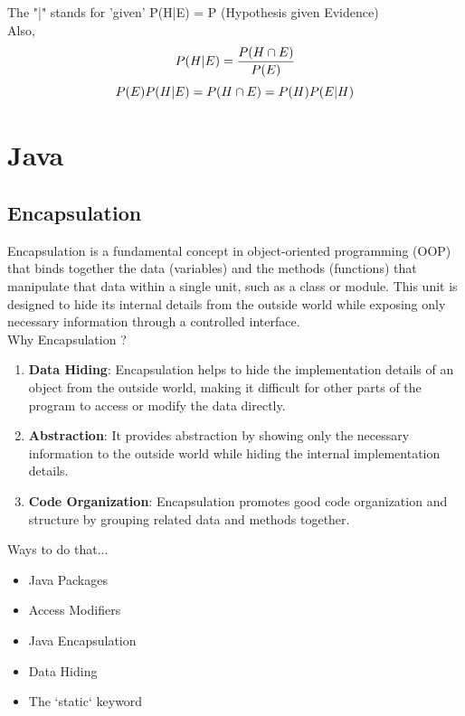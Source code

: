 \documentclass{book}
\begin{document}
The "|" stands for 'given'
P(H|E)  = P (Hypothesis \space given \space Evidence) \\
Also,
\begin{equation}
	P(H|E)=\frac{P(H \cap E)}{P(E)}\\
	\label{important}
\end{equation}
\begin{equation}
	P(E)P(H|E)=P(H \cap E)=P(H)P(E|H)\\
	\label{important2}
\end{equation}
\chapter{Java}
\section{Encapsulation}
Encapsulation is a fundamental concept in object-oriented programming (OOP) that binds together the data (variables) and the methods (functions)
that manipulate that data within a single unit, such as a class or module. This unit is designed to hide its internal details from the outside
world while exposing only necessary information through a controlled interface.\\
Why Encapsulation ?
\begin{enumerate}
	\item \textbf{Data Hiding}: Encapsulation helps to hide the implementation details of an object from the outside world, making it difficult for other parts of the program to access or modify the data directly.

	\item \textbf{Abstraction}: It provides abstraction by showing only the necessary information to the outside world while hiding the internal implementation details.

	\item \textbf{Code Organization}: Encapsulation promotes good code organization and structure by grouping related data and methods together.
\end{enumerate}
Ways to do that...
\begin{itemize}
	\item Java Packages
	\item Access Modifiers
	\item Java Encapsulation
	\item Data Hiding
	\item The `static` keyword
\end{itemize}
\end{document}
